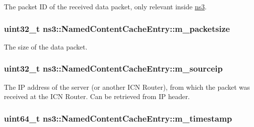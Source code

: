 The packet I\-D of the received data packet, only relevant inside \hyperlink{namespacens3}{ns3}. 

\hypertarget{classns3_1_1NamedContentCacheEntry_aa7848090a3ba7346183ddad2b4630717}{
\subsubsection[{m\-\_\-packetsize}]{\setlength{\rightskip}{0pt plus 5cm}uint32\-\_\-t ns3\-::\-Named\-Content\-Cache\-Entry\-::m\-\_\-packetsize\hspace{0.3cm}{\ttfamily [private]}}}\label{classns3_1_1NamedContentCacheEntry_aa7848090a3ba7346183ddad2b4630717}


The size of the data packet. 

\hypertarget{classns3_1_1NamedContentCacheEntry_a9ec65f4809ae05fd4efacdd2adca90a1}{
\subsubsection[{m\-\_\-sourceip}]{\setlength{\rightskip}{0pt plus 5cm}uint32\-\_\-t ns3\-::\-Named\-Content\-Cache\-Entry\-::m\-\_\-sourceip\hspace{0.3cm}{\ttfamily [private]}}}\label{classns3_1_1NamedContentCacheEntry_a9ec65f4809ae05fd4efacdd2adca90a1}


The I\-P address of the server (or another I\-C\-N Router), from which the packet was received at the I\-C\-N Router. Can be retrieved from I\-P header. 

\hypertarget{classns3_1_1NamedContentCacheEntry_a39bcfa21f1215510a93ea3dbf7ff40b0}{
\subsubsection[{m\-\_\-timestamp}]{\setlength{\rightskip}{0pt plus 5cm}uint64\-\_\-t ns3\-::\-Named\-Content\-Cache\-Entry\-::m\-\_\-timestamp\hspace{0.3cm}{\ttfamily [private]}}}\label{classns3_1_1NamedContentCacheEntry_a39bcfa21f1215510a93ea3dbf7ff40b0}


